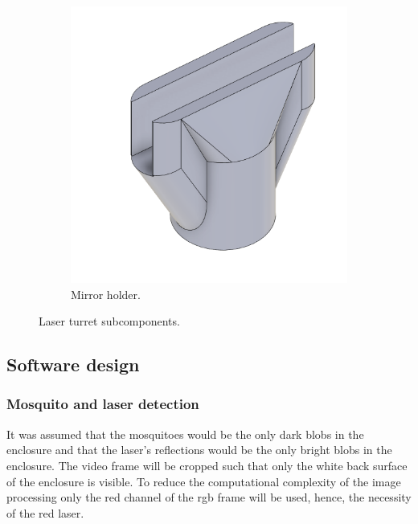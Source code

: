 \begin{figure}[!htb]
\begin{subfigure}{0.3\textwidth}
    \includegraphics[width=0.7\linewidth]{figures/hardware_design/mirror_holder.png}
    \caption{Mirror holder.}
  \end{subfigure}
  \caption{Laser turret subcomponents.}
  \label{fig:turret_subcomponents}
\end{figure}



\FloatBarrier
\subsection{Software design}\label{subsec:software_design}
\subsubsection{Mosquito and laser detection} \label{subsubsec:mosquito_and_laser_detection}
It was assumed that the mosquitoes would be the only dark blobs in the enclosure and that the laser's reflections would be the only bright blobs in the enclosure. The video frame will be cropped such that only the white back surface of the enclosure is visible. To reduce the computational complexity of the image processing only the red channel of the \gls{rgb} frame will be used, hence, the necessity of the red laser.

